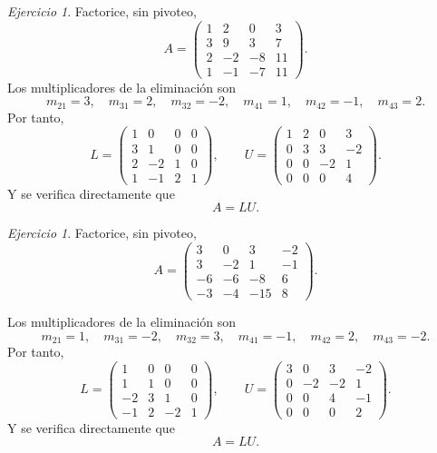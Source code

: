 \documentclass[12pt]{article}
\theoremstyle{remark}
\newtheorem{Ejer}[definicion]{Ejercicio}
\begin{document}
\begin{Ejer}
Factorice, sin pivoteo,
\[
A=\begin{pmatrix}1 & 2 & 0 & 3\\3 & 9 & 3 & 7\\2 & -2 & -8 & 11\\1 & -1 & -7 & 11\end{pmatrix}.
\]
Los multiplicadores de la eliminación son
\[
m_{21}=3,\quad m_{31}=2,\quad m_{32}=-2,\quad m_{41}=1,\quad m_{42}=-1,\quad m_{43}=2.
\]
Por tanto,
\[
L=\begin{pmatrix}1 & 0 & 0 & 0\\3 & 1 & 0 & 0\\2 & -2 & 1 & 0\\1 & -1 & 2 & 1\end{pmatrix},\qquad U=\begin{pmatrix}1 & 2 & 0 & 3\\0 & 3 & 3 & -2\\0 & 0 & -2 & 1\\0 & 0 & 0 & 4\end{pmatrix}.
\]
Y se verifica directamente que
\[
\boxed{A=LU}.
\]
\end{Ejer}
\begin{Ejer} Factorice, sin pivoteo,
\[
A=\begin{pmatrix}3 & 0 & 3 & -2\\3 & -2 & 1 & -1\\-6 & -6 & -8 & 6\\-3 & -4 & -15 & 8\end{pmatrix}.
\]

Los multiplicadores de la eliminación son
\[
m_{21}=1,\quad m_{31}=-2,\quad m_{32}=3,\quad m_{41}=-1,\quad m_{42}=2,\quad m_{43}=-2.
\]
Por tanto,
\[
L=\begin{pmatrix}1 & 0 & 0 & 0\\1 & 1 & 0 & 0\\-2 & 3 & 1 & 0\\-1 & 2 & -2 & 1\end{pmatrix},\qquad U=\begin{pmatrix}3 & 0 & 3 & -2\\0 & -2 & -2 & 1\\0 & 0 & 4 & -1\\0 & 0 & 0 & 2\end{pmatrix}.
\]
Y se verifica directamente que
\[
\boxed{A=LU}.
\]

\end{Ejer}
\end{document}
